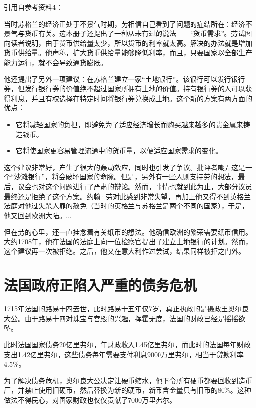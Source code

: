 \documentclass[12pt,oneside]{book}
\begin{document}
引用自参考资料4：
\begin{mdframed}
当时苏格兰的经济正处于不景气时期，劳相信自己看到了问题的症结所在：经济不景气与货币有关。这本册子还提出了一种从未有过的说法——“货币需求”。劳试图向读者说明，由于货币供给量太少，所以货币的利率就太高。解决的办法就是增加货币供给量。他声称，扩大货币供给量能够降低利率，而且，只要国家以全部生产能力运行，就不会导致通货膨胀。

他还提出了另外一项建议：在苏格兰建立一家“土地银行”。该银行可以发行银行券，但发行银行券的价值绝不超过国家所拥有土地的价值。持有银行券的人可以获得利息，并且有权选择在特定时间将银行券兑换成土地。这个新的方案有两方面的优点：

\begin{itemize}
\item 它将减轻国家的负担，即避免为了适应经济增长而购买越来越多的贵金属来铸造钱币。
\item 它将使国家更容易管理流通中的货币量，以便适应国家需求的变化。
\end{itemize}


这个建议非常好，产生了很大的轰动效应，同时也引发了争议。批评者嘲弄这是一个“沙滩银行”，将会破坏国家的命脉。但是，另外有一些人则支持劳的想法，最后，议会也对这个问题进行了严肃的辩论。然而，事情也就到此为止，大部分议员最终还是拒绝了这个方案。约翰·劳对此感到非常失望，再加上他又得不到英格兰法庭对他过失杀人罪的赦免（当时的英格兰与苏格兰是两个不同的国家），于是，他又回到欧洲大陆。...

但在劳的心里，还一直挂念着有关纸币的想法。他确信欧洲的繁荣需要纸币信用。大约1708年，他在法国的法庭上向一位检察官提出了建立土地银行的计划。然而，这个建议再一次被拒绝。之后，他又在意大利作过尝试，结果同样被拒之门外。
\end{mdframed}

\section{法国政府正陷入严重的债务危机}
1715年法国的路易十四去世，此时路易十五年仅7岁，真正执政的是摄政王奥尔良大公。由于路易十四对珠宝与宫殿的兴趣，挥霍无度，法国的财政已经是摇摇欲坠。

此时法国国家债务20亿里弗尔，年财政收入1.45亿里弗尔，而此时的法国每年财政支出1.42亿里弗尔，这些债务每年需要支付利息9000万里弗尔，相当于贷款利率4.5\%。

为了解决债务危机，奥尔良大公决定让硬币缩水，他下令所有硬币都要回收到造币厂，并禁止使用旧硬币，然后替换为新的硬币，新币含金量只有旧币的80\%。这种做法不得民心，对国家财政也仅仅贡献了7000万里弗尔。
\end{document}

